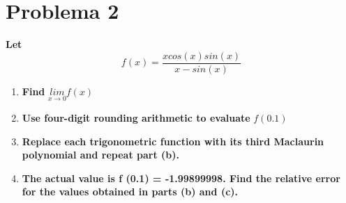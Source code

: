 \section*{Problema 2}
\textbf{Let}
\begin{equation}
    f(x) = \frac{xcos(x)sin(x)}{x-sin(x)}
    \label{eq:problem2fx}
\end{equation}
\begin{enumerate}
    \item \textbf{Find} $\underset{x\rightarrow 0}{lim} f(x)$

          
    \item \textbf{Use four-digit rounding arithmetic to evaluate} $f(0.1)$

          
    \item \textbf{Replace each trigonometric function with its third Maclaurin polynomial and repeat part (b).}

          
    \item \textbf{The actual value is f (0.1) = -1.99899998. Find the relative error for the values obtained in parts (b) and (c).}

          
\end{enumerate}